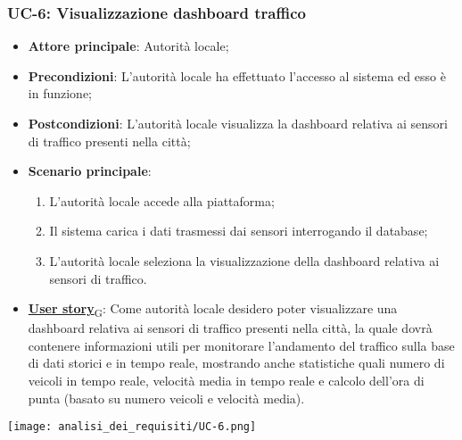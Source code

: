 \subsubsection{UC-6: Visualizzazione dashboard traffico}
\begin{itemize}
	\item \textbf{Attore principale}: Autorità locale;
	\item \textbf{Precondizioni}: L'autorità locale ha effettuato l'accesso al sistema ed esso è in funzione;
	\item \textbf{Postcondizioni}: L'autorità locale visualizza la dashboard relativa
	      ai sensori di traffico presenti nella città;
	\item \textbf{Scenario principale}:
	      \begin{enumerate}
		      \item L'autorità locale accede alla piattaforma;
		      \item Il sistema carica i dati trasmessi dai sensori interrogando il database;
		      \item L'autorità locale seleziona la visualizzazione della dashboard relativa ai sensori di traffico.
	      \end{enumerate}
	\item \href{https://7last.github.io/docs/rtb/documentazione-interna/glossario\#user-story}{\textbf{User story}\textsubscript{G}}:
	      Come autorità locale desidero poter visualizzare una dashboard relativa ai sensori di traffico presenti nella città, la quale
	      dovrà contenere informazioni utili per monitorare l'andamento del traffico sulla base di dati storici e in tempo reale, mostrando
	      anche statistiche quali numero di veicoli in tempo reale, velocità media in tempo reale e calcolo dell'ora di punta (basato su numero veicoli e velocità media).
\end{itemize}
\begin{center}
	\texttt{[image: analisi\_dei\_requisiti/UC-6.png]}
\end{center}

